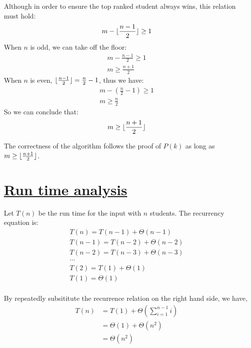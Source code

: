 \documentclass[11pt]{article}
\DeclarePairedDelimiter\floor{\lfloor}{\rfloor}
\begin{document}
Although in order to ensure the top ranked student always wins, this
relation must hold:
\begin{equation}
  m - \floor{\frac{n-1}{2}} \geq 1
\end{equation}
When $n$ is odd, we can take off the floor:
\begin{equation}
\begin{split}
  m - \frac{n-1}{2} \geq 1\\
  m  \geq \frac{n+1}{2}
\end{split}
\end{equation}
When $n$ is even, $\floor{\frac{n-1}{2}} = \frac{n}{2}-1$, thus we have:
\begin{equation}
\begin{split}
  m -  (\frac{n}{2}-1)\geq 1\\
  m  \geq \frac{n}{2}
\end{split}
\end{equation}
So we can conclude that:
\begin{equation}
  m  \geq \floor{\frac{n+1}{2}}
\end{equation}

The correctness of the algorithm follows the proof of $P(k)$ as long
as $m \geq \floor{\frac{n+1}{2}}$.

\section*{\underline{Run time analysis}}
Let $T(n)$ be the run time for the input with $n$ students. The
recurrency equation is:
\begin{equation}
\begin{split}
  T(n) = T(n-1) + \Theta(n-1)\\
  T(n-1) = T(n-2) + \Theta(n-2)\\
  T(n-2) = T(n-3) + \Theta(n-3)\\
  \cdots\\
  T(2) = T(1) + \Theta(1)\\
  T(1) = \Theta(1)\\
\end{split}
\end{equation}

By repeatedly subsititute the recurrence relation on the right hand
side, we have,
\begin{equation}
\begin{split}
  T(n) &= T(1) + \Theta(\sum_{i=1}^{n-1} i)\\
  &= \Theta(1) + \Theta(n^2)\\
  &= \Theta(n^2)\\
\end{split}
\end{equation}
\end{document}
